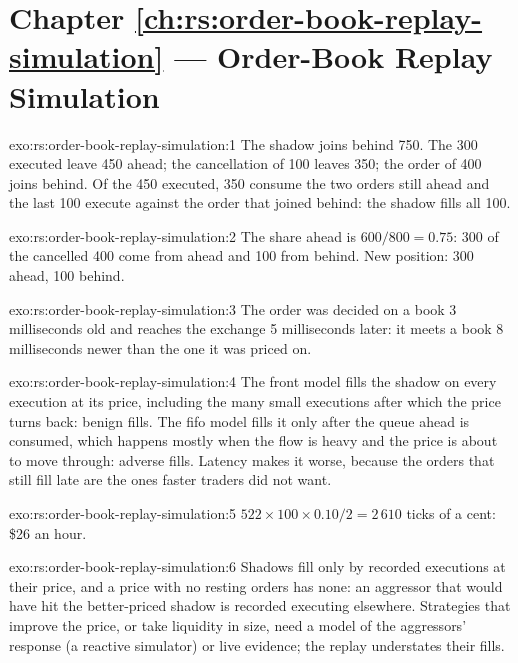 \section*{Chapter \ref{ch:rs:order-book-replay-simulation} --- Order-Book Replay Simulation}

\begin{solution}{exo:rs:order-book-replay-simulation:1}
The shadow joins behind 750. The 300 executed leave 450 ahead; the cancellation of 100 leaves 350; the order of 400 joins behind. Of the 450 executed,
350 consume the two orders still ahead and the last 100 execute against the order that joined behind: the shadow fills all 100.
\end{solution}

\begin{solution}{exo:rs:order-book-replay-simulation:2}
The share ahead is $600/800 = 0.75$: 300 of the cancelled 400 come from ahead and 100 from behind. New position: 300 ahead, 100 behind.
\end{solution}

\begin{solution}{exo:rs:order-book-replay-simulation:3}
The order was decided on a book 3 milliseconds old and reaches the exchange 5 milliseconds later: it meets a book 8 milliseconds newer than the one it was
priced on.
\end{solution}

\begin{solution}{exo:rs:order-book-replay-simulation:4}
The front model fills the shadow on every execution at its price, including the many small executions after which the price turns back: benign fills. The
fifo model fills it only after the queue ahead is consumed, which happens mostly when the flow is heavy and the price is about to move through: adverse
fills. Latency makes it worse, because the orders that still fill late are the ones faster traders did not want.
\end{solution}

\begin{solution}{exo:rs:order-book-replay-simulation:5}
$522 \times 100 \times 0.10/2 = 2\,610$ ticks of a cent: \$26 an hour.
\end{solution}

\begin{solution}{exo:rs:order-book-replay-simulation:6}
Shadows fill only by recorded executions at their price, and a price with no resting orders has none: an aggressor that would have hit the better-priced shadow
is recorded executing elsewhere. Strategies that improve the price, or take liquidity in size, need a model of the aggressors' response (a reactive simulator)
or live evidence; the replay understates their fills.
\end{solution}

